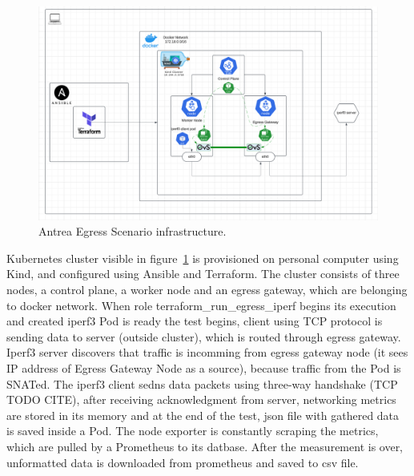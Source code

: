 \begin{figure}[tbh]
  \centering
  \includegraphics[width=1\columnwidth]{images/antrea_egress_gatateway_cluster.png}
  \caption{Antrea Egress Scenario infrastructure.}
  \label{fig:antreaEgressScenarioArch}
\end{figure}

Kubernetes cluster visible in figure~\ref{fig:antreaEgressScenarioArch} is provisioned on personal computer using Kind, and configured using Ansible and Terraform. The cluster consists of three nodes, a control plane, a worker node and an egress gateway, which are belonging to docker network. When role terraform\_run\_egress\_iperf begins its execution and created iperf3 Pod is ready the test begins, client using TCP protocol is sending data to server (outside cluster), which is routed through egress gateway. Iperf3 server discovers that traffic is incomming from egress gateway node (it sees IP address of Egress Gateway Node as a source), because traffic from the Pod is SNATed.
The iperf3 client sedns data packets using three-way handshake (TCP TODO CITE), after receiving acknowledgment from server, networking metrics are stored in its memory and at the end of the test, json file with gathered data is saved inside a Pod. The node exporter is constantly scraping the metrics, which are pulled by a Prometheus to its datbase. After the measurement is over, unformatted data is downloaded from prometheus and saved to csv file.

